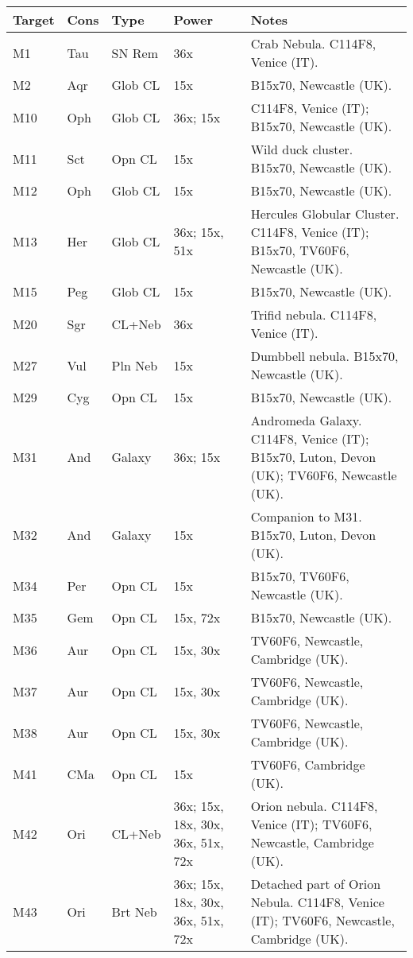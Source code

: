 \begin{longtable}{ p{0.8in}  p{0.3in}  p{0.5in}  p{0.9in}  p{5.8in} }
\hline 
{\bf Target} & {\bf Cons} & {\bf Type} & {\bf Power} & {\bf Notes} \\ 
\hline 
M1 & Tau & SN Rem & 36x & Crab Nebula. C114F8, Venice (IT). \\ 
M2 & Aqr & Glob CL & 15x & B15x70, Newcastle (UK). \\ 
M10 & Oph & Glob CL & 36x; 15x & C114F8, Venice (IT); B15x70, Newcastle (UK). \\ 
M11 & Sct & Opn CL & 15x & Wild duck cluster. B15x70, Newcastle (UK). \\ 
M12 & Oph & Glob CL & 15x & B15x70, Newcastle (UK). \\ 
M13 & Her & Glob CL & 36x; 15x, 51x & Hercules Globular Cluster. C114F8, Venice (IT); B15x70, TV60F6, Newcastle (UK). \\ 
M15 & Peg & Glob CL & 15x & B15x70, Newcastle (UK). \\ 
M20 & Sgr & CL+Neb & 36x & Trifid nebula. C114F8, Venice (IT). \\ 
M27 & Vul & Pln Neb & 15x & Dumbbell nebula. B15x70, Newcastle (UK). \\ 
M29 & Cyg & Opn CL & 15x & B15x70, Newcastle (UK). \\ 
M31 & And & Galaxy & 36x; 15x & Andromeda Galaxy. C114F8, Venice (IT); B15x70, Luton, Devon (UK); TV60F6, Newcastle (UK). \\ 
M32 & And & Galaxy & 15x & Companion to M31. B15x70, Luton, Devon (UK). \\ 
M34 & Per & Opn CL & 15x & B15x70, TV60F6, Newcastle (UK). \\ 
M35 & Gem & Opn CL & 15x, 72x & B15x70, Newcastle (UK). \\ 
M36 & Aur & Opn CL & 15x, 30x & TV60F6, Newcastle, Cambridge (UK). \\ 
M37 & Aur & Opn CL & 15x, 30x & TV60F6, Newcastle, Cambridge (UK). \\ 
M38 & Aur & Opn CL & 15x, 30x & TV60F6, Newcastle, Cambridge (UK). \\ 
M41 & CMa & Opn CL & 15x & TV60F6, Cambridge (UK). \\ 
M42 & Ori & CL+Neb & 36x; 15x, 18x, 30x, 36x, 51x, 72x & Orion nebula. C114F8, Venice (IT); TV60F6, Newcastle, Cambridge (UK). \\ 
M43 & Ori & Brt Neb & 36x; 15x, 18x, 30x, 36x, 51x, 72x & Detached part of Orion Nebula. C114F8, Venice (IT); TV60F6, Newcastle, Cambridge (UK). \\ 

\end{longtable}
